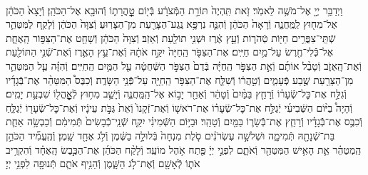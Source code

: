 \documentclass[twoside, openany, parskip=half, 11pt]{book}
\begin{document}
\begin{sometimes}
\begin{footnotesize}
\begin{multicols}{2}
\\
וַיְדַבֵּ֥ר יְיָ֖ אֶל־מֹשֶׁ֥ה לֵּאמֹֽר׃ זֹ֤את תִּֽהְיֶה֙ תּוֹרַ֣ת הַמְּֿצֹרָ֔ע בְּֿי֖וֹם טׇׇׇׇׇׇׇׇׇׇׇׇׇׇָֽהֳרָת֑וֹ וְֿהוּבָ֖א אֶל־הַכֹּהֵֽן׃ וְֿיָצָא֙ הַכֹּהֵ֔ן אֶל־מִח֖וּץ לַֽמַּֽחֲנֶ֑ה וְֿרָאָה֙ הַכֹּהֵ֔ן וְֿהִנֵּ֛ה נִרְפָּ֥א נֶֽגַע־הַצָּרַ֖עַת מִן־הַצָּרֽוּעַ׃ וְֿצִוָּה֙ הַכֹּהֵ֔ן וְֿלָקַ֧ח לַמִּטַּהֵ֛ר שְֿׁתֵּֽי־צִפֳּרִ֥ים חַיּ֖וֹת טְֿהֹר֑וֹת וְֿעֵ֣ץ אֶ֔רֶז וּשְׁנִ֥י תוֹלַ֖עַת וְֿאֵזֹֽב׃ וְֿצִוָּה֙ הַכֹּהֵ֔ן וְֿשָׁחַ֖ט אֶת־הַצִּפּ֣וֹר הָֽאֶחָ֑ת אֶל־כְּֿֿלִי־חֶ֖רֶשׂ עַל־מַ֥יִם חַיִּֽים׃  אֶת־הַצִּפֹּ֤ר הַֽחַיָּה֙ יִקַּ֣ח אֹתָ֔הּ וְֿאֶת־עֵ֥ץ הָאֶ֛רֶז וְֿאֶת־שְֿׁנִ֥י הַתּוֹלַ֖עַת וְֿאֶת־הָֽאֵזֹ֑ב וְֿטָבַ֨ל אוֹתָ֜ם וְֿאֵ֣ת הַצִּפֹּ֣ר הַֽחַיָּ֗ה בְּֿדַם֙ הַצִּפֹּ֣ר הַשְּֿׁחֻטָ֔ה עַ֖ל הַמַּ֥יִם הַֽחַיִּֽים׃ וְֿהִזָּ֗ה עַ֧ל הַמִּטַּהֵ֛ר מִן־הַצָּרַ֖עַת שֶׁ֣בַע פְּֿעָמִ֑ים וְֿטִ֣הֲר֔וֹ וְֿשִׁלַּ֛ח אֶת־הַצִּפֹּ֥ר הַֽחַיָּ֖ה עַל־פְּֿֿנֵ֥י הַשָּׂדֶֽה׃ וְֿכִבֶּס֩ הַמִּטַּהֵ֨ר אֶת־בְּֿֿגָדָ֜יו וְֿגִלַּ֣ח אֶת־כׇּל־שְֿׂעָר֗וֹ וְֿרָחַ֤ץ בַּמַּ֨יִם֙ וְֿטָהֵ֔ר וְֿאַחַ֖ר יָב֣וֹא אֶל־הַֽמַּֽחֲנֶ֑ה וְֿיָשַׁ֛ב מִח֥וּץ לְֿאׇׇׇׇׇׇׇׇׇׇָֽהֳל֖וֹ שִׁבְעַ֥ת יָמִֽים׃ וְֿהָיָה֩ בַיּ֨וֹם הַשְּֿׁבִיעִ֜י יְֿגַלַּ֣ח אֶת־כׇּל־שְֿׂעָר֗וֹ אֶת־רֹאשׁ֤וֹ וְֿאֶת־זְֿקָנוֹ֙ וְֿאֵת֙ גַּבֹּ֣ת עֵינָ֔יו וְֿאֶת־כׇּל־שְֿׂעָר֖וֹ יְֿגַלֵּ֑חַ וְֿכִבֶּ֣ס אֶת־בְּֿֿגָדָ֗יו וְֿרָחַ֧ץ אֶת־בְּֿֿשָׂר֛וֹ בַּמַּ֖יִם וְֿטָהֵֽר׃  וּבַיּ֣וֹם הַשְּֿׁמִינִ֗י יִקַּ֤ח שְֿׁנֵֽי־כְֿֿבָשִׂים֙ תְּֿמִימִ֔ם וְֿכַבְשָׂ֥ה אַחַ֛ת בַּת־שְֿׁנָתָ֖הּ תְּֿמִימָ֑ה וּשְׁלשָׁ֣ה עֶשְׂרֹנִ֗ים סֹ֤לֶת מִנְחָה֙ בְּֿלוּלָ֣ה בַשֶּׁ֔מֶן וְֿלֹ֥ג אֶחָ֖ד שָֽׁמֶן׃ וְֿהֶֽעֱמִ֞יד הַכֹּהֵ֣ן הַֽמְטַהֵ֗ר אֵ֛ת הָאִ֥ישׁ הַמִּטַּהֵ֖ר וְֿאֹתָ֑ם לִפְנֵ֣י יְיָ֔ פֶּ֖תַח אֹ֥הֶל מוֹעֵֽד׃ וְֿלָקַ֨ח הַכֹּהֵ֜ן אֶת־הַכֶּ֣בֶשׂ הָֽאֶחָ֗ד וְֿהִקְרִ֥יב אֹת֛וֹ לְֿאָשָׁ֖ם וְֿאֶת־לֹ֣ג הַשָּׁ֑מֶן וְֿהֵנִ֥יף אֹתָ֛ם תְּֿנוּפָ֖ה לִפְנֵ֥י יְיָ׃


\end{multicols}
\end{footnotesize}
\end{sometimes}
\end{document}
